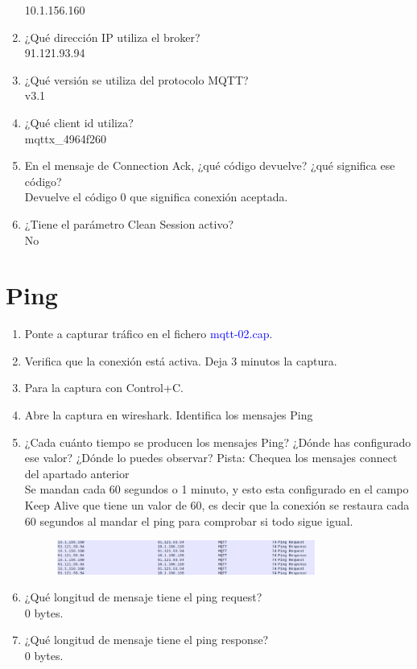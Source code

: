 \documentclass[12pt, a4paper]{report}
\begin{document}
\begin{enumerate}
	10.1.156.160
	\item ¿Qué dirección IP utiliza el broker?\\
	
	91.121.93.94
	\item ¿Qué versión se utiliza del protocolo MQTT?\\
	
	v3.1
	\item ¿Qué client id utiliza?\\
	
	mqttx\_4964f260
	\item En el mensaje de Connection Ack, ¿qué código devuelve? ¿qué significa ese código?\\
	
	Devuelve el código 0 que significa conexión aceptada.
	\item ¿Tiene el parámetro Clean Session activo?\\
	
	No
\end{enumerate}
\chapter{Ping}
\begin{enumerate}
	\item Ponte a capturar tráfico en el fichero \textcolor{blue}{mqtt-02.cap}.
	\item Verifica que la conexión está activa. Deja 3 minutos la captura.
	\item Para la captura con Control+C.
	\item Abre la captura en wireshark. Identifica los mensajes Ping
	\item ¿Cada cuánto tiempo se producen los mensajes Ping? ¿Dónde has configurado ese valor? ¿Dónde
	lo puedes observar? Pista: Chequea los mensajes connect del apartado anterior\\
	
	Se mandan cada 60 segundos o 1 minuto, y esto esta configurado en el campo Keep Alive que tiene un valor de 60, es decir que la conexión se restaura cada 60 segundos al mandar el ping para comprobar si todo sigue igual.\\
	\begin{figure}[H]
		\centering
		\includegraphics[width=0.8\textwidth]{ej5.4}
	\end{figure}
	\item ¿Qué longitud de mensaje tiene el ping request?\\
	
	0 bytes.
	\item ¿Qué longitud de mensaje tiene el ping response?\\
	
	0 bytes.
\end{enumerate}
\end{document}
